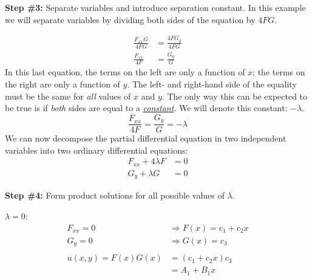 \noindent\textbf{Step \#3:} Separate variables and introduce separation constant.  In this example we will separate variables by dividing both sides of the equation by $4FG$.

\begin{align*}
\frac{F_{xx} G}{4FG} &= \frac{4FG_y}{4FG} \\
\frac{F_{xx}}{4F} &= \frac{G_y}{G}
\end{align*}
In this last equation, the terms on the left are only a function of $x$; the terms on the right are only a function of $y$.  The left- and right-hand side of the equality must be the same for \emph{all} values of $x$ and $y$.  The only way this can be expected to be true is if \emph{both} sides are equal to a \emph{\underline{constant}}.  We will denote this constant: $-\lambda$.
\begin{equation*}
\frac{F_{xx}}{4F} = \frac{G_y}{G} = -\lambda 
\end{equation*}
We can now decompose the partial differential equation in two independent variables into two ordinary differential equations:
\begin{align*}
F_{xx} + 4\lambda F &= 0 \\
G_y + \lambda G &= 0
\end{align*}

\vspace{0.5cm}

\noindent\textbf{Step \#4:} Form product solutions for all possible values of $\lambda$.

\vspace{0.25cm}

\noindent\underline{$\lambda = 0$}:
\begin{align*}
F_{xx} = 0 &\Rightarrow F(x) = c_1 + c_2x \\
G_y = 0 &\Rightarrow G(x) = c_3 \\
& \\
u(x,y) = F(x)G(x) &= \left(c_1 + c_2x\right) c_3 \\
 &= A_1 + B_1 x
\end{align*}

